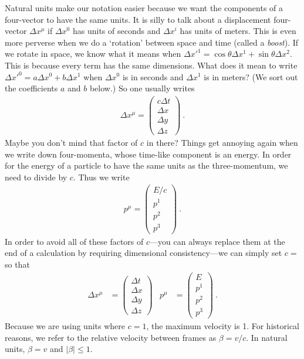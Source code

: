 Natural units make our notation easier because we want the components of a four-vector to have the same units. It is silly to talk about a displacement four-vector $\Delta x^\mu$ if $\Delta x^0$ has units of seconds and $\Delta x^i$ has units of meters. This is even more perverse when we do a `rotation' between space and time (called a \emph{boost}). If we rotate in space, we know what it means when $\Delta x'^1 = \cos\theta \Delta x^1 + \sin\theta \Delta x^2$. This is because every term has the same dimensions. What does it mean to write $\Delta x'^0 = a \Delta x^0 + b \Delta x^1$ when $\Delta x^0$ is in seconds and $\Delta x^1$ is in meters? (We sort out the coefficients $a$ and $b$ below.) So one usually writes 
\begin{align}
    \Delta x^\mu = 
    \begin{pmatrix}
        c\Delta t \\ \Delta x \\ \Delta y \\ \Delta z
    \end{pmatrix} \ .
\end{align}
Maybe you don't mind that factor of $c$ in there? Things get annoying again when we write down four-momenta, whose time-like component is an energy. In order for the energy of a particle to have the same units as the three-momentum, we need to divide by $c$. Thus we write
\begin{align}
    p^\mu = 
    \begin{pmatrix}
        E/c \\
        p^1\\
        p^2\\
        p^3
    \end{pmatrix} \ .
\end{align}
In order to avoid all of these factors of $c$---you can always replace them at the end of a calculation by requiring dimensional consistency---we can simply set $c=$ so that
\begin{align}
    \Delta x^\mu &= 
    \begin{pmatrix}
        \Delta t \\ \Delta x \\ \Delta y \\ \Delta z
    \end{pmatrix}
    &
    p^\mu &= 
    \begin{pmatrix}
        E \\
        p^1\\
        p^2\\
        p^3
    \end{pmatrix} \ .
    \label{eq:momentum:4vec}
\end{align}
Because we are using units where $c=1$, the maximum velocity is 1. For historical reasons, we refer to the relative velocity between frames as $\beta = v/c$. In natural units, $\beta = v$ and $|\beta| \leq 1$.  


